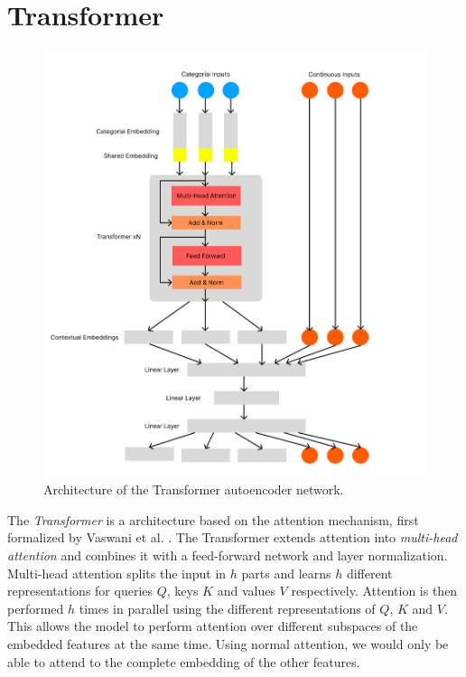 \section{Transformer}

\begin{figure}
\centering
	\includegraphics[width=1.2\linewidth]{transformer_autoencoder.png}
	\caption{Architecture of the Transformer autoencoder network.}
	\label{transformer_autoencoder}
\end{figure}

The \textit{Transformer} is a architecture based on the attention mechanism, first formalized by Vaswani et al. \cite{attention_is_all_you_need}. The Transformer extends attention into \textit{multi-head attention} and combines it with a feed-forward network and layer normalization. Multi-head attention \cite{attention_is_all_you_need} splits the input in $h$ parts and learns $h$ different representations for queries $Q$, keys $K$ and values $V$ respectively. Attention is then performed $h$ times in parallel using the different representations of $Q$, $K$ and $V$. This allows the model to perform attention over different subspaces of the embedded features at the same time. Using normal attention, we would only be able to attend to the complete embedding of the other features.

